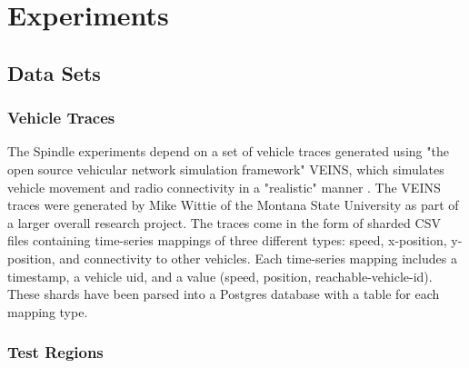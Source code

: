 \documentclass{thesis}
\begin{document}



\chapter{Experiments}
\section{Data Sets}
\subsection{Vehicle Traces}
   The Spindle experiments depend on a set of vehicle traces 
   generated using "the open source vehicular network simulation framework" VEINS, which simulates
   vehicle movement and radio connectivity in a "realistic" manner \cite{veins}. The VEINS traces
   were generated by Mike Wittie of the Montana State University as part of a larger overall research
   project. 
   The traces come in the form of sharded CSV files containing time-series mappings of three different types:
   speed, x-position, y-position, and connectivity to other vehicles. Each time-series mapping includes
   a timestamp, a vehicle uid, and a value (speed, position, reachable-vehicle-id). 
   These shards have been parsed into a Postgres database with a table for each mapping type.
\subsection{Test Regions} %
\end{document}
